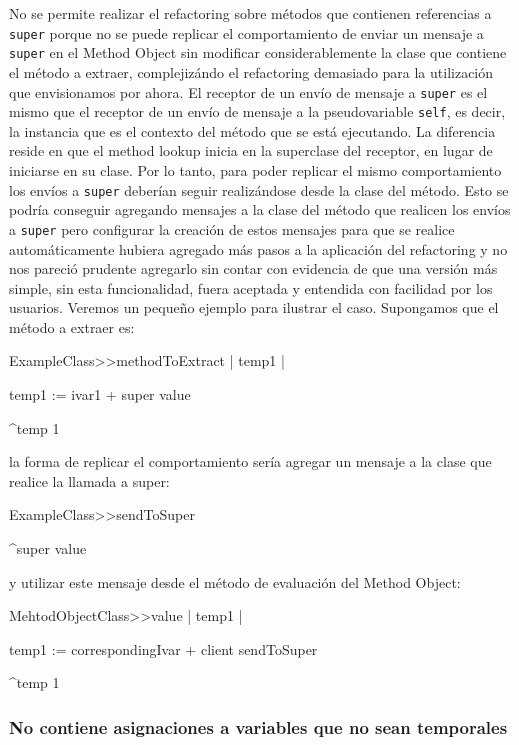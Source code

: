 No se permite realizar el refactoring sobre métodos que contienen referencias a \lstinline{super}
porque no se puede replicar el comportamiento de enviar un mensaje a \lstinline{super} en el Method
Object sin modificar considerablemente la clase que contiene el método a extraer, complejizándo el
refactoring demasiado para la utilización que envisionamos por ahora. El receptor de un envío de
mensaje a \lstinline{super} es el mismo que el receptor de un envío de mensaje a la pseudovariable
\lstinline{self}, es decir, la instancia que es el contexto del método que se está ejecutando. La
diferencia reside en que el method lookup inicia en la superclase del receptor, en lugar de
iniciarse en su clase. Por lo tanto, para poder replicar el mismo comportamiento los envíos a
\lstinline{super} deberían seguir realizándose desde la clase del método. Esto se podría conseguir
agregando mensajes a la clase del método que realicen los envíos a \lstinline{super} pero configurar
la creación de estos mensajes para que se realice automáticamente hubiera agregado más pasos a la aplicación
del refactoring y no nos pareció prudente agregarlo sin contar con evidencia de que una versión más simple,
sin esta funcionalidad, fuera aceptada y entendida con facilidad por los usuarios. Veremos un pequeño ejemplo
para ilustrar el caso. Supongamos que el método a extraer es:

\begin{code}
ExampleClass>>methodToExtract
    | temp1 |

    temp1 := ivar1 + super value

    ^temp 1
\end{code}

la forma de replicar el comportamiento sería agregar un mensaje a la clase que realice la llamada a super:

\begin{code}
ExampleClass>>sendToSuper

    ^super value
\end{code}

y utilizar este mensaje desde el método de evaluación del Method Object:

\begin{code}
MehtodObjectClass>>value
    | temp1 |

    temp1 := correspondingIvar + client sendToSuper

    ^temp 1
\end{code}


\subsubsection*{No contiene asignaciones a variables que no sean temporales}

